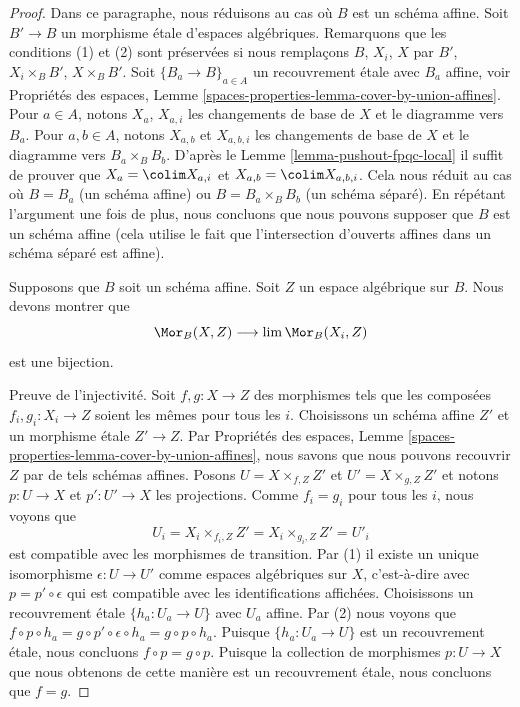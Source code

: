 \begin{proof}
Dans ce paragraphe, nous réduisons au cas où $B$ est un schéma affine.
Soit $B' \to B$ un morphisme \'etale d'espaces algébriques.
Remarquons que les conditions (1) et (2) sont préservées si nous remplaçons
$B$, $X_i$, $X$ par $B'$, $X_i \times_B B'$, $X \times_B B'$.
Soit $\{B_a \to B\}_{a \in A}$ un recouvrement \'etale avec $B_a$
affine, voir Propriétés des espaces, Lemme
\ref{spaces-properties-lemma-cover-by-union-affines}.
Pour $a \in A$, notons $X_a$, $X_{a, i}$ les changements de base de $X$ et le
diagramme vers $B_a$. Pour $a, b \in A$, notons
$X_{a, b}$ et $X_{a, b, i}$ les changements de base de $X$ et le
diagramme vers $B_a \times_B B_b$.
D'après le Lemme \ref{lemma-pushout-fpqc-local}
il suffit de prouver que $X_a = \colim X_{a, i}$ et
$X_{a, b} = \colim X_{a, b, i}$.
Cela nous réduit au cas où $B = B_a$ (un schéma affine) ou $B = B_a \times_B B_b$ (un schéma séparé). En répétant l'argument une fois de plus, nous concluons que nous pouvons supposer que $B$ est un schéma affine (cela utilise le fait que l'intersection d'ouverts affines dans un schéma séparé est affine).

\medskip\noindent
Supposons que $B$ soit un schéma affine. Soit $Z$ un espace algébrique sur $B$.
Nous devons montrer que
$$
\Mor_B(X, Z) \longrightarrow \lim \Mor_B(X_i, Z)
$$
est une bijection.

\medskip\noindent
Preuve de l'injectivité. Soit $f, g : X \to Z$ des morphismes tels que les composées $f_i, g_i : X_i \to Z$ soient les mêmes pour tous les $i$. Choisissons un schéma affine $Z'$ et un morphisme \'etale $Z' \to Z$. Par Propriétés des espaces, Lemme \ref{spaces-properties-lemma-cover-by-union-affines}, nous savons que nous pouvons recouvrir $Z$ par de tels schémas affines. Posons $U = X \times_{f, Z} Z'$ et $U' = X \times_{g, Z} Z'$ et notons $p : U \to X$ et $p' : U' \to X$ les projections. Comme $f_i = g_i$ pour tous les $i$, nous voyons que $$
U_i = X_i \times_{f_i, Z} Z' = X_i \times_{g_i, Z} Z' = U'_i
$$ est compatible avec les morphismes de transition. Par (1) il existe un unique isomorphisme $\epsilon : U \to U'$ comme espaces algébriques sur $X$, c'est-à-dire avec $p = p' \circ \epsilon$ qui est compatible avec les identifications affichées. Choisissons un recouvrement \'etale $\{h_a : U_a \to U\}$ avec $U_a$ affine. Par (2) nous voyons que $f \circ p \circ h_a = g \circ p' \circ \epsilon \circ h_a =
g \circ p \circ h_a$. Puisque $\{h_a : U_a \to U\}$ est un recouvrement \'etale, nous concluons $f \circ p = g \circ p$. Puisque la collection de morphismes $p : U \to X$ que nous obtenons de cette manière est un recouvrement \'etale, nous concluons que $f = g$.


\end{proof}
